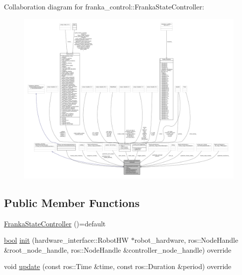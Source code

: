 Collaboration diagram for franka\+\_\+control\+:\+:Franka\+State\+Controller\+:
\nopagebreak
\begin{figure}[H]
\begin{center}
\leavevmode
\includegraphics[width=350pt]{classfranka__control_1_1FrankaStateController__coll__graph}
\end{center}
\end{figure}
\subsection*{Public Member Functions}
\begin{DoxyCompactItemize}
\item 
\hyperlink{classfranka__control_1_1FrankaStateController_a6207d8555975e26ed6a3cfcbb40c7397}{Franka\+State\+Controller} ()=default
\item 
\hyperlink{classbool}{bool} \hyperlink{classfranka__control_1_1FrankaStateController_aa8929333f04012a8b1b9049a5264e157}{init} (hardware\+\_\+interface\+::\+Robot\+HW $\ast$robot\+\_\+hardware, ros\+::\+Node\+Handle \&root\+\_\+node\+\_\+handle, ros\+::\+Node\+Handle \&controller\+\_\+node\+\_\+handle) override
\item 
void \hyperlink{classfranka__control_1_1FrankaStateController_ad7a282e355860395576ff4d116bbbb7b}{update} (const ros\+::\+Time \&time, const ros\+::\+Duration \&period) override
\end{DoxyCompactItemize}
